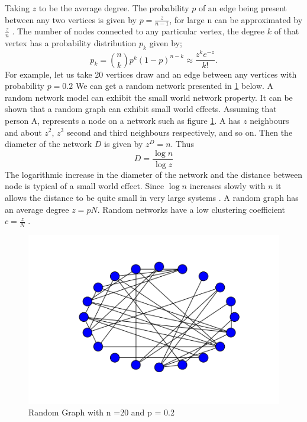  Taking $z$ to be the average degree.
 The probability $p$ of an edge being present between any two vertices is given by $p = \frac{z}{n-1}$, for large n can be approximated by $\frac{z}{n}$ \citep{newman2002random}. The number of nodes connected to any particular vertex,
 the degree $k$ of that vertex has a probability distribution $p_k$ given by;
 \begin{equation}
 p_k = \binom{n}{k} p^k (1-p)^{n-k} \approx \frac{z^k e^{-z}}{k!}.
\end{equation}
For example, let us take 20 vertices draw and an edge between any  vertices with probability $p = 0.2$ We can get a random network presented in
\ref{fig:3.1} below. A random network model can exhibit the small world network property.  
  It can be shown that a random graph can exhibit small world effects. Assuming that person A, represents a node on a network such as figure \ref{fig:3.1}. A has $z$ neighbours and about $z^2$, $z^3$ second and third neighbours respectively, and so on. Then the diameter of the network $D$ is given by $z^D = n$. Thus
   \begin{equation*}
D = \frac{\log n}{\log z} 
\end{equation*}
    The logarithmic increase in the diameter of the network and the distance between node is typical of a small world effect. Since $\log n$ increases slowly with $n$ it allows the distance to be quite small in very large systems \citep{newman2000models}.
    A random graph  has an average degree $z= pN$.
    Random networks have a low clustering coefficient $ c = \frac{z}{N}$ \citep{newman2003structure}.
   \begin{figure}[h!]
   \caption{Random Graph with n =20 and p = 0.2}
   \label{fig:3.1}
   \centering
   \includegraphics[scale=0.5]{images/randomgraph.png} 
   \end{figure}
   
